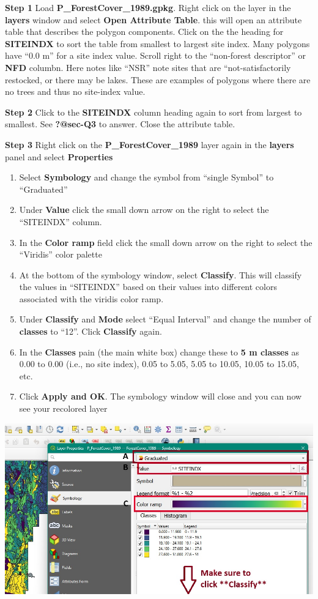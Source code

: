 \documentclass[
  letterpaper,
]{book}
\begin{document}
\textbf{Step 1} Load \textbf{P\_ForestCover\_1989.gpkg}. Right click on
the layer in the \textbf{layers} window and select \textbf{Open
Attribute Table}. this will open an attribute table that describes the
polygon components. Click on the the heading for \textbf{SITEINDX} to
sort the table from smallest to largest site index. Many polygons have
``0.0 m'' for a site index value. Scroll right to the ``non-forest
descriptor'' or \textbf{NFD} columbn. Here notes like ``NSR'' note sites
that are ``not-satisfactorily restocked, or there may be lakes. These
are examples of polygons where there are no trees and thus no site-index
value.

\textbf{Step 2} Click to the \textbf{SITEINDX} column heading again to
sort from largest to smallest. See \textbf{?@sec-Q3} to answer. Close
the attribute table.

\textbf{Step 3} Right click on the \textbf{P\_ForestCover\_1989} layer
again in the \textbf{layers} panel and select \textbf{Properties}

\begin{enumerate}
\def\labelenumi{\Alph{enumi}.}
\item
  Select \textbf{Symbology} and change the symbol from ``single Symbol''
  to ``Graduated''
\item
  Under \textbf{Value} click the small down arrow on the right to select
  the ``SITEINDX'' column.
\item
  In the \textbf{Color ramp} field click the small down arrow on the
  right to select the ``Viridis'' color palette
\item
  At the bottom of the symbology window, select \textbf{Classify}. This
  will classify the values in ``SITEINDX'' based on their values into
  different colors associated with the viridis color ramp.
\item
  Under \textbf{Classify} and \textbf{Mode} select ``Equal Interval''
  and change the number of \textbf{classes} to ``12''. Click
  \textbf{Classify} again.
\item
  In the \textbf{Classes} pain (the main white box) change these to
  \textbf{5 m classes} as 0.00 to 0.00 (i.e., no site index), 0.05 to
  5.05, 5.05 to 10.05, 10.05 to 15.05, etc.
\item
  Click \textbf{Apply and OK}. The symbology window will close and you
  can now see your recolored layer
\end{enumerate}

\includegraphics{images/QGIS image.jpg}
\end{document}
